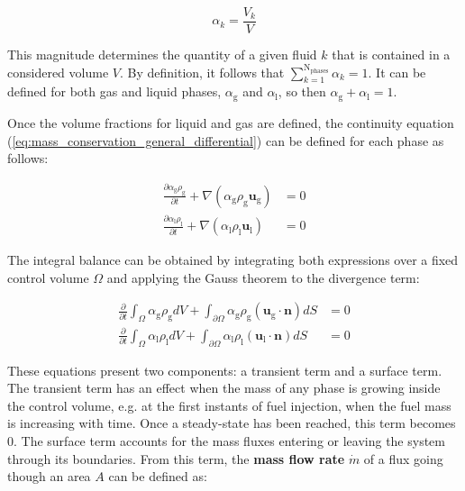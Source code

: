 \begin{equation}
\label{eq:vol_frac_definition}
\alpha_k = \frac{V_k}{V}
\end{equation}

This magnitude determines the quantity of a given fluid $k$ that is contained in a considered volume $V$. By definition, it follows that $\sum_{k=1}^\mathrm{N_{phases}} \alpha_k = 1$. It can be defined for both gas and liquid phases, $\alpha_\mathrm{g}$ and $\alpha_\mathrm{l}$, so then $\alpha_\mathrm{g} + \alpha_\mathrm{l} = 1$.

Once the volume fractions for liquid and gas are defined, the continuity equation (\ref{eq:mass_conservation_general_differential}) can be defined for each phase as follows:

\begin{subequations}
\begin{align}
\frac{\partial \alpha_\mathrm{g} \rho_\mathrm{g} }{\partial t} + \nabla \left( \alpha_\mathrm{g} \rho_\mathrm{g} \boldsymbol{u}_\mathrm{g} \right) &= 0  \\
\frac{\partial \alpha_\mathrm{l} \rho_\mathrm{l} }{\partial t} + \nabla \left( \alpha_\mathrm{l} \rho_\mathrm{l} \boldsymbol{u}_\mathrm{l} \right) &= 0
\end{align}
\end{subequations}

The integral balance can be obtained by integrating both expressions over a fixed control volume $\Omega$ and applying the Gauss theorem to the divergence term:

\begin{subequations}
\label{eq:mass_conservation_general_bothPhases_showingIntegrals}
\begin{align}
\frac{\partial}{\partial t} \int_{\Omega} \alpha_\mathrm{g} \rho_\mathrm{g} dV + \int_{\partial {\Omega}} \alpha_\mathrm{g} \rho_\mathrm{g} \left( \boldsymbol{u}_\mathrm{g} \cdot \boldsymbol{n} \right) dS &= 0  \\
\frac{\partial}{\partial t} \int_{\Omega} \alpha_\mathrm{l} \rho_\mathrm{l} dV + \int_{\partial {\Omega}} \alpha_\mathrm{l} \rho_\mathrm{l} \left( \boldsymbol{u}_\mathrm{l} \cdot \boldsymbol{n} \right) dS &= 0 
\end{align}
\end{subequations}

These equations present two components: a transient term and a surface term. The transient term has an effect when the mass of any phase is growing inside the control volume, e.g. at the first instants of fuel injection, when the fuel mass is increasing with time. Once a steady-state has been reached, this term becomes $0$. The surface term accounts for the mass fluxes entering or leaving the system through its boundaries. From this term, the \textbf{mass flow rate} $\dot{m}$ of a flux going though an area $A$ can be defined as:

